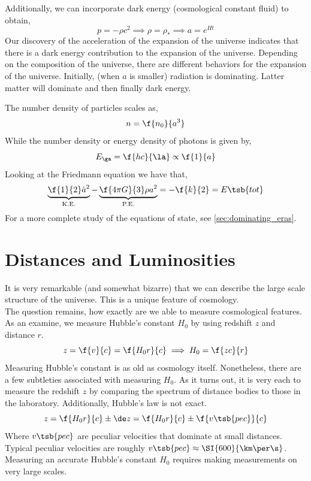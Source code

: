 \documentclass{article}
\begin{document}
Additionally, we can incorporate dark energy (cosmological constant fluid) to obtain,
\[ p = - \rho c^2 \implies \rho = \rho_{*} \implies a = e^{Ht}\]
Our discovery of the acceleration of the expansion of the universe indicates that there is a dark energy contribution to the expansion of the universe. Depending on the composition of the universe, there are different behaviors for the expansion of the universe. Initially, (when $a$ is smaller) radiation is dominating. Latter matter will dominate and then finally dark energy.
\begin{center}
\end{center}
The number density of particles scales as,
\[ n = \f{n_0}{a^3} \]
While the number density or energy density of photons is given by,
\[ E_{\ga} = \f{hc}{\la} \propto \f{1}{a} \]
Looking at the Friedmann equation we have that,
\[ \underbrace{\f{1}{2} \dot a^2}_{\text{K.E.}} - \underbrace{\f{4 \pi G}{3} \rho a^2}_{\text{P.E.}} = -\f{k}{2} = E\tsb{tot} \]
For a more complete study of the equations of state, see \cref{sec:dominating_eras}.
\section{Distances and Luminosities}
It is very remarkable (and somewhat bizarre) that we can describe the large scale structure of the universe. This is a unique feature of cosmology. \\

The question remains, how exactly are we able to measure cosmological features. As an examine, we measure Hubble's constant $H_{0}$ by using redshift $z$ and distance $r$.
\[ z = \f{v}{c} = \f{H_0 r}{c} \implies H_0 = \f{zc}{r} \]
Measuring Hubble's constant is as old as cosmology itself. Nonetheless, there are a few subtleties associated with measuring $H_0$. As it turns out, it is very each to measure the redshift $z$ by comparing the spectrum of distance bodies to those in the laboratory. Additionally, Hubble's law is not exact.
\[ z = \f{H_0 r}{c} \pm \de z = \f{H_0 r}{c} \pm \f{v\tsb{pec}}{c} \]
Where $v\tsb{pec}$ are peculiar velocities that dominate at small distances. Typical peculiar velocities are roughly $v\tsb{pec} \approx \SI{600}{\km \per \s}$. Measuring an accurate Hubble's constant $H_0$ requires making measurements on very large scales. \\
\end{document}

